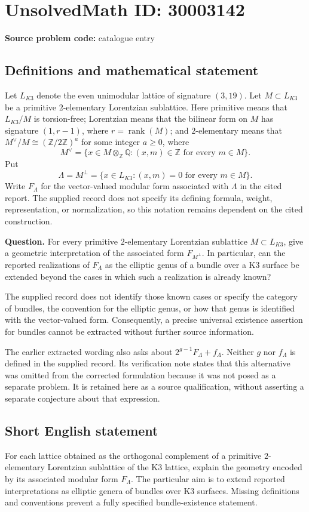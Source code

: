 \documentclass[11pt]{article}
\newcommand{\Z}{\mathbb{Z}}
\newcommand{\Q}{\mathbb{Q}}
\begin{document}
\section*{UnsolvedMath ID: 30003142}
\textbf{Source problem code:} catalogue entry
\subsection{Definitions and mathematical statement}
Let \(L_{K3}\) denote the even unimodular lattice of signature \((3,19)\). Let \(M\subset L_{K3}\) be a primitive \(2\)-elementary Lorentzian sublattice. Here primitive means that \(L_{K3}/M\) is torsion-free; Lorentzian means that the bilinear form on \(M\) has signature \((1,r-1)\), where \(r=\operatorname{rank}(M)\); and \(2\)-elementary means that \(M^\vee/M\cong(\Z/2\Z)^a\) for some integer \(a\geq0\), where
\[
M^\vee=\{x\in M\otimes_{\Z}\Q:(x,m)\in\Z\text{ for every }m\in M\}.
\]
Put
\[
\Lambda=M^\perp=\{x\in L_{K3}:(x,m)=0\text{ for every }m\in M\}.
\]
Write \(F_\Lambda\) for the vector-valued modular form associated with \(\Lambda\) in the cited report. The supplied record does not specify its defining formula, weight, representation, or normalization, so this notation remains dependent on the cited construction.

\textbf{Question.} For every primitive \(2\)-elementary Lorentzian sublattice \(M\subset L_{K3}\), give a geometric interpretation of the associated form \(F_{M^\perp}\). In particular, can the reported realizations of \(F_\Lambda\) as the elliptic genus of a bundle over a K3 surface be extended beyond the cases in which such a realization is already known?

The supplied record does not identify those known cases or specify the category of bundles, the convention for the elliptic genus, or how that genus is identified with the vector-valued form. Consequently, a precise universal existence assertion for bundles cannot be extracted without further source information.

The earlier extracted wording also asks about \(2^{g-1}F_\Lambda+f_\Lambda\). Neither \(g\) nor \(f_\Lambda\) is defined in the supplied record. Its verification note states that this alternative was omitted from the corrected formulation because it was not posed as a separate problem. It is retained here as a source qualification, without asserting a separate conjecture about that expression.
\subsection{Short English statement}
For each lattice obtained as the orthogonal complement of a primitive \(2\)-elementary Lorentzian sublattice of the K3 lattice, explain the geometry encoded by its associated modular form \(F_\Lambda\). The particular aim is to extend reported interpretations as elliptic genera of bundles over K3 surfaces. Missing definitions and conventions prevent a fully specified bundle-existence statement.
\end{document}
